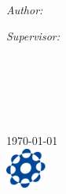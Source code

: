 \documentclass[11pt, oneside]{Thesis} %
\begin{document}
\begin{titlepage}
\begin{center}
\vfill

\HRule \\[0.4cm] %
{\huge \bfseries \ttitle}\\[0.4cm] %
\HRule \\[1.5cm] %
 
\begin{minipage}{0.4\textwidth}
\begin{flushleft} \large
\emph{Author:}\\
\authornames %
\end{flushleft}
\end{minipage}
\begin{minipage}{0.4\textwidth}
\begin{flushright} \large
\emph{Supervisor:} \\
\supname %
\end{flushright}
\end{minipage}\\[4.5cm]
 
\textsc{\Large \degreename}\\[4.5cm] %
 
\large \deptname\\
\facname\\
\univname\\[2cm] %
 
{\large \today}\\[2.5cm] %
\includegraphics[width=0.1\textwidth]{misc/sokendai} %
 \examname
\vfill
\end{center}
\end{titlepage}



\end{document}
